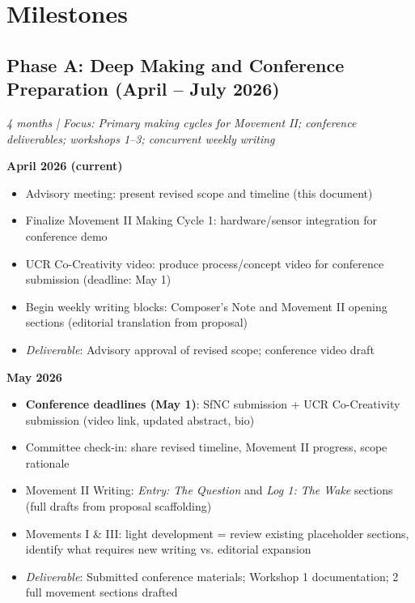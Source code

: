 \section{Milestones}


\subsection*{Phase A: Deep Making and Conference Preparation (April – July 2026)}
\textit{4 months | Focus: Primary making cycles for Movement II; conference deliverables; workshops 1–3; concurrent weekly writing}

\textbf{April 2026 (current)}
\begin{itemize}[noitemsep]
	\item Advisory meeting: present revised scope and timeline (this document)
	\item Finalize Movement II Making Cycle 1: hardware/sensor integration for conference demo
	\item UCR Co-Creativity video: produce process/concept video for conference submission (deadline: May 1)
	\item Begin weekly writing blocks: Composer's Note and Movement II opening sections (editorial translation from proposal)
	\item \textit{Deliverable}: Advisory approval of revised scope; conference video draft
\end{itemize}

\textbf{May 2026}
\begin{itemize}[noitemsep]
	\item \textbf{Conference deadlines (May 1)}: SfNC submission + UCR Co-Creativity submission (video link, updated abstract, bio)
	\item Committee check-in: share revised timeline, Movement II progress, scope rationale
	\item Movement II Writing: \textit{Entry: The Question} and \textit{Log 1: The Wake} sections (full drafts from proposal scaffolding)
	\item Movements I \& III: light development = review existing placeholder sections, identify what requires new writing vs. editorial expansion
	\item \textit{Deliverable}: Submitted conference materials; Workshop 1 documentation; 2 full movement sections drafted
\end{itemize}

